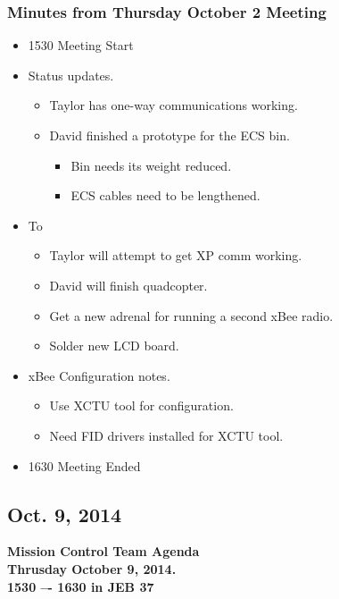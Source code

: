 \documentclass[pdftex,11pt]{article}
\begin{document}
\subsubsection[short]{Minutes from Thursday October 2 Meeting}
\begin{itemize}
	\item 1530 \indent Meeting Start
	\item  Status updates.
	\begin{itemize}
		\item Taylor has one-way communications working.
		\item  David finished a prototype for the ECS bin.
		\begin{itemize}
			\item Bin needs its weight reduced.
			\item ECS cables need to be lengthened.
		\end{itemize}
	\end{itemize}
	\item  To 
	\begin{itemize}
		\item Taylor will attempt to get XP comm working.
		\item David will finish quadcopter.
		\item Get a new adrenal for running a second xBee  radio.
		\item Solder new LCD board.
	\end{itemize}
	\item xBee  Configuration notes.
	\begin{itemize}
		\item Use XCTU tool for configuration.
		\item Need FID drivers installed for XCTU tool.
	\end{itemize}
	\item 1630 \indent Meeting Ended
\end{itemize}	


\subsection{Oct. 9, 2014}
{ \huge \bfseries Mission Control Team Agenda \\[0.4cm] }
{ \huge \bfseries Thrusday October 9, 2014.\\1530 –-  1630  in JEB 37\\[0.4cm] }
\vspace*{2.5mm}
\end{document}
